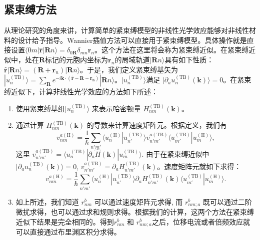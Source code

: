 \subsection{紧束缚方法}

从理论研究的角度来讲，计算简单的紧束缚模型的非线性光学效应能够对非线性材料的设计给予指导\cite{fregoso_quantitative_2016,cook_design_2017}。Wannier插值方法可以直接用于紧束缚模型。具体操作就是直接设置$\langle0m|\hat{\mathbf{r}}|\mathbf{R}n\rangle=\delta_{0\mathbf{R}}\delta_{mn}\mathbf{r}_{n}$。这个方法在这里将会称为紧束缚近似。在紧束缚近似中，处在$\mathbf{R}$标记的元胞内坐标为$\mathbf{r}_{n}$的局域轨道$|\mathbf{R}n\rangle$具有如下性质：$\hat{\mathbf{r}}|\mathbf{R}n\rangle=(\mathbf{R} + \mathbf{r}_{n}) |\mathbf{R}n\rangle$。于是，我们定义紧束缚基矢为$|u_{n}^{(\textrm{TB})}\rangle=\sum_{\mathbf{R}}e^{-i\mathbf{k}\cdot(\hat{\mathbf{r}}-\mathbf{R}-\mathbf{r_{n}})}|\mathbf{R}n\rangle$。$|u_{n}^{(\textrm{TB})}\rangle$满足 $|\partial_{a}u_{n}^{(\textrm{TB})}(\mathbf{k})\rangle=0$。在紧束缚近似下，计算非线性光学效应的方法如下所述：
\begin{enumerate}
	\item 使用紧束缚基组$|u_{n}^{(\textrm{TB})}\rangle$ 来表示哈密顿量 $H^{(\textrm{TB})}_{nm}(\mathbf{k})$。
	\item 通过计算 $H^{(\textrm{TB})}_{nm}(\mathbf{k})$ 的导数来计算速度矩阵元。根据定义，我们有\[
	v_{nm}^{a(\textrm{H})}=\frac{1}{\hbar}\sum_{n'm'}\langle u_{n}^{(\textrm{H})}|u_{n'}^{(\textrm{TB})}\rangle v_{n'm'}^{a(\textrm{TB})}\langle u_{m'}^{(\textrm{TB})}|u_{m}^{(\textrm{H})}\rangle,
	\]这里 $v_{n'm'}^{a(\textrm{TB})} = \langle u_{n}^{(\textrm{TB})}|\partial_{a}\hat{H}(\mathbf{k})|u_{m}^{(\textrm{TB})}\rangle$. 由于在紧束缚近似中 $|\partial_{a}u_{n}^{(\textrm{TB})}(\mathbf{k})\rangle=0$, $v_{n'm'}^{a(\textrm{TB})} = \partial_{a}H_{n'm'}^{(\textrm{TB})}(\mathbf{k})$。速度矩阵元就如下求得：
	\begin{equation}
	v_{nm}^{a(\textrm{H})}=\frac{1}{\hbar}\sum_{n'm'}\langle u_{n}^{(\textrm{H})}|u_{n'}^{(\textrm{TB})}\rangle\partial_{a}H_{n'm'}^{(\textrm{TB})}(\mathbf{k})\langle u_{m'}^{(\textrm{TB})}|u_{m}^{(\textrm{H})}\rangle.\label{eq:v-tight-binding}
	\end{equation}
	\item 如上所述，我们知道 $r_{nm}^{b}$ 可以通过速度矩阵元求得, 而 $r_{nm;a}^{b}$ 既可以通过二阶微扰求得，也可以通过求和规则求得。根据我们的计算，这两个方法在紧束缚近似下结果是完全相同的。得到$r_{nm}^{b}$ 和 $r_{nm;a}^{b}$之后，位移电流或者倍频效应就可以直接通过布里渊区积分求得。
\end{enumerate}

